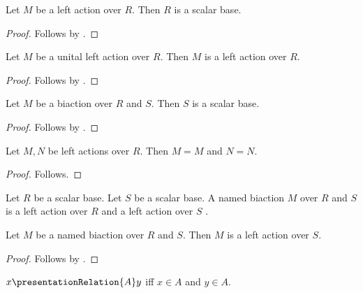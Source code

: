 \begin{proposition}\label{left_action_parameter}
    Let $M$ be a left action over $R$.
    Then $R$ is a scalar base.
\end{proposition}
\begin{proof}
    Follows by .
\end{proof}

\begin{proposition}\label{unital_left_action_parent}
    Let $M$ be a unital left action over $R$.
    Then $M$ is a left action over $R$.
\end{proposition}
\begin{proof}
    Follows by .
\end{proof}

\begin{proposition}\label{biaction_second_parameter}
    Let $M$ be a biaction over $R$ and $S$.
    Then $S$ is a scalar base.
\end{proposition}
\begin{proof}
    Follows by .
\end{proof}

\begin{proposition}\label{grouped_left_actions}
    Let $M,N$ be left actions over $R$.
    Then $M=M$ and $N=N$.
\end{proposition}
\begin{proof}
    Follows.
\end{proof}

\begin{struct}\label{named_biaction}
    Let $R$ be a scalar base.
    Let $S$ be a scalar base.
    A named biaction $M$ over $R$ and $S$ is
    a left action over $R$ \label{named_biaction_left}
    and a left action over $S$ \label{named_biaction_right}.
\end{struct}

\begin{proposition}\label{named_biaction_parent}
    Let $M$ be a named biaction over $R$ and $S$.
    Then $M$ is a left action over $S$.
\end{proposition}
\begin{proof}
    Follows by .
\end{proof}

\begin{definition}\label{presentation_relation}
    $x\presentationRelation{A}y$ iff $x\in A$ and $y\in A$.
\end{definition}

